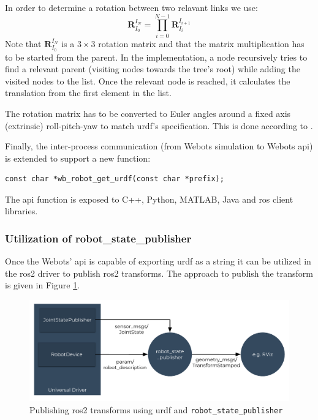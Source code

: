 In order to determine a rotation between two relavant links we use:
\begin{equation}
    \bm{R}_{I_0}^{I_N} = \prod_{i=0}^{N-1} \bm{R}_{I_i}^{I_{i+1}}
\end{equation}
Note that $ \bm{R}_{I_0}^{I_N} $ is a $ 3 \times 3 $ rotation matrix and that the matrix multiplication has to be started from the parent.
In the implementation, a node recursively tries to find a relevant parent (visiting nodes towards the tree's root) while adding the visited nodes to the list.
Once the relevant node is reached, it calculates the translation from the first element in the list.

The rotation matrix has to be converted to Euler angles around a fixed axis (extrinsic) roll-pitch-yaw to match \ac{urdf}'s specification. This is done according to \cite[p. 9]{eberly_euler_nodate}.

Finally, the inter-process communication (from Webots simulation to Webots \ac{api}) is extended to support a new function:

\begin{verbatim}
const char *wb_robot_get_urdf(const char *prefix);
\end{verbatim}

The \ac{api} function is exposed to C++, Python, MATLAB, Java and \ac{ros} client libraries.

\subsubsection{Utilization of robot\_state\_publisher}

Once the Webots' \ac{api} is capable of exporting \ac{urdf} as a string it can be utilized in the \ac{ros2} driver to publish \ac{ros2} transforms.
The approach to publish the transform is given in Figure \ref{fig:generalization:transforms_method_3}.

\begin{figure}[H]
    \centering
    \includegraphics[width=\textwidth]{generalization/figures/transforms_method_3.pdf}
    \caption{Publishing \ac{ros2} transforms using \ac{urdf} and \texttt{robot\_state\_publisher}}
    \label{fig:generalization:transforms_method_3}
\end{figure}

